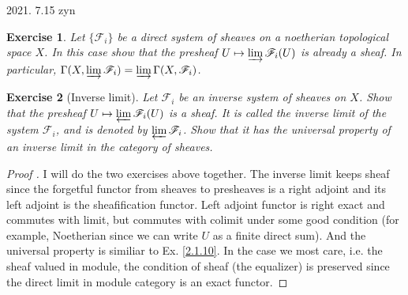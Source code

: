 \documentclass{amsart}
\newtheorem{exe}{Exercise}[subsection]
\begin{document}
2021. 7.15 zyn
\begin{exe}
Let $\lbrace \mathscr{F}_{i}   \rbrace$ be a direct system of sheaves on a noetherian topological space $X$.  In this case show that the presheaf  $U \mapsto \varinjlim\mathscr{F}_{i}(U)$ is already a sheaf.  In particular,  $\Gamma(X,\varinjlim{\mathscr{F}_{i}})=\varinjlim{\Gamma(X,\mathscr{F}_{i})}$.
\end{exe}
\begin{exe}[Inverse limit]
Let ${\mathscr{F}_{i}}$ be an inverse system of sheaves on $X$.  Show that the presheaf $U \mapsto \varprojlim\mathscr{F}_{i}(U)$ is a sheaf.  It is called the inverse limit of the system ${\mathscr{F}_{i}}$,  and is denoted by $\varprojlim\mathscr{F}_{i}$.  Show that it has the universal property of an inverse limit in the category of sheaves.
\end{exe}
\begin{proof}[Proof \footnotemark]
I will do the two exercises above together.  The inverse limit keeps sheaf since the forgetful functor from sheaves to presheaves is a right adjoint and its left adjoint is the sheafification functor.  Left adjoint functor is right exact and commutes with limit, but commutes with colimit under some good condition (for example,  Noetherian since we can write $U$ as a finite direct sum). And the universal property is similiar to Ex. \ref{2.1.10}.
In the case we most care,  i.e.  the sheaf valued in module,  the condition of sheaf (the equalizer) is preserved since the direct limit in module category is an exact functor.
\end{proof}
\end{document}
